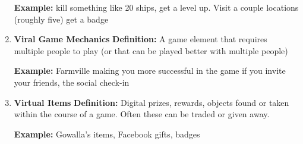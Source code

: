 \begin{enumerate}
\textbf{Example:} kill something like 20 ships, get a level up. Visit a couple locations (roughly five) get a badge

\item \textbf{Viral Game Mechanics}
\textbf{Definition:} A game element that requires multiple people to play (or that can be played better with multiple people)

\textbf{Example:} Farmville making you more successful in the game if you invite your friends, the social check-in

\item \textbf{Virtual Items}
\textbf{Definition:} Digital prizes, rewards, objects found or taken within the course of a game. Often these can be traded or given away.

\textbf{Example:} Gowalla’s items, Facebook gifts, badges
\end{enumerate}